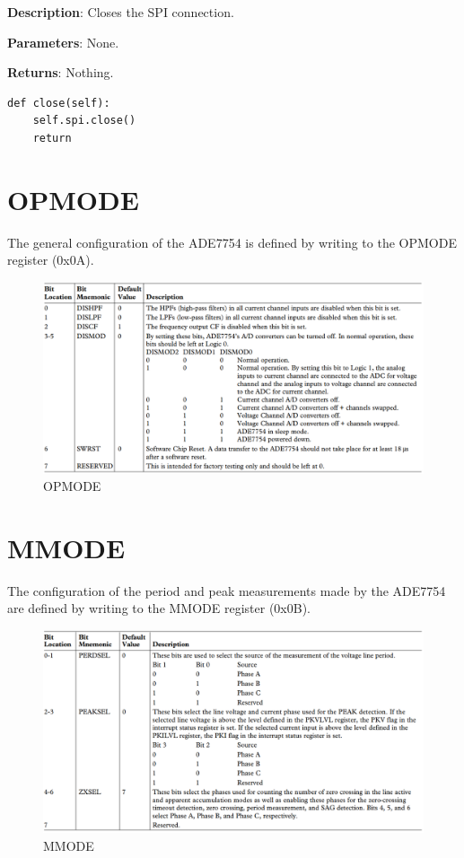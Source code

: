 \documentclass{scrartcl}  %
\begin{document}
\textbf{Description}: Closes the SPI connection.

\textbf{Parameters}: None.

\textbf{Returns}: Nothing.

\begin{lstlisting}
def close(self):
	self.spi.close()
	return
\end{lstlisting}

\section{OPMODE}
The general configuration of the ADE7754 is defined by writing to the OPMODE register (0x0A).
\begin{figure}[H]
\centering
\includegraphics[width=1\textwidth]{opmode.png}
\caption{OPMODE}\label{fig:myFigure1}
\end{figure}

\newpage

\section{MMODE}
The configuration of the period and peak measurements made by the ADE7754 are defined by writing to the MMODE register (0x0B).
\begin{figure}[H]
\centering
\includegraphics[width=1\textwidth]{mmode.png}
\caption{MMODE}\label{fig:myFigure2}
\end{figure}
\end{document}
